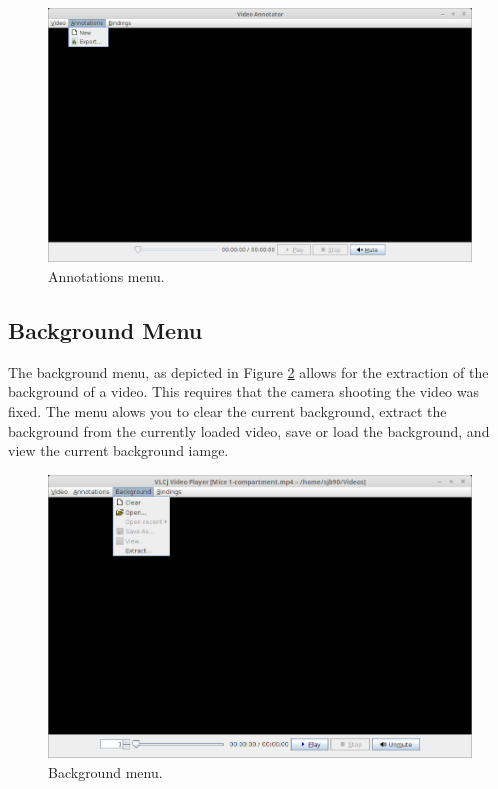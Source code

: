 \documentclass[a4paper]{book}
\begin{document}
\begin{figure}[htb]
  \centering
  \includegraphics[width=12.0cm]{images/AnnotatorAnnotationMenu.png}
  \caption{Annotations menu.}
  \label{AnnotatorAnnotationMenu}
\end{figure}

\subsection{Background Menu}
The background menu, as depicted in Figure \ref{AnnotatorBackgroundMenu} allows for the extraction of the background
of a video. This requires that the camera shooting the video was fixed. The menu alows you to clear the current
background, extract the background from the currently loaded video, save or load the background, and view the
current background iamge.


\begin{figure}[htb]
  \centering
  \includegraphics[width=12.0cm]{images/AnnotatorBackgroundMenu.png}
  \caption{Background menu.}
  \label{AnnotatorBackgroundMenu}
\end{figure}
\end{document}
